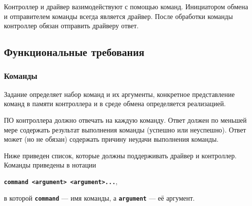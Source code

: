 \documentclass[14pt]{extarticle}
\begin{document}
Контроллер и драйвер вазимодействуют с помощью команд.
Инициатором обмена и отправителем команды всегда является драйвер.
После обработки команды контроллер обязан отправить драйверу ответ.

\subsection{Функциональные требования}

\subsubsection{Команды}

Задание определяет набор команд и их аргументы, конкретное представление команд
в памяти контроллера и в среде обмена определяется реализацией.

ПО контроллера должно отвечать на каждую команду.
Ответ должен по меньшей мере содержать результат выполнения команды (успешно
или неуспешно).
Ответ может (но не обязан) содержать причину неудачи выполнения команды.

Ниже приведен список, которые должны поддерживать драйвер и контроллер.
Команды приведены в нотации

\begin{center}
 \texttt{\textbf{command <argument> <argument>...}},
\end{center}

в которой \texttt{\textbf{command}} --- имя команды, а \texttt{\textbf{argument}}
--- её аргумент.
\end{document}

